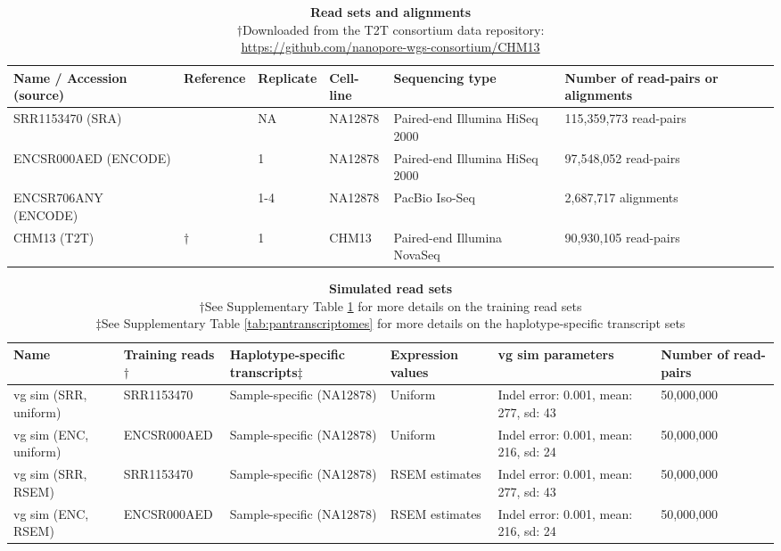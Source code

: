 \documentclass[11pt]{ucthesis}
\begin{document}
\begin{table}[H]
\footnotesize
\begin{tabular}{L{0.15\textwidth}| L{0.1\textwidth} | L{0.09\textwidth} | L{0.09\textwidth} | L{0.17\textwidth} | R{0.16\textwidth}}
\textbf{Name / Accession (source)} & \textbf{Reference} & \textbf{Replicate} & \textbf{Cell-line} & \textbf{Sequencing type} & \textbf{Number of read-pairs or alignments} \\
\midrule
SRR1153470 (SRA) & \cite{tilgner2014defining} & NA & NA12878 & Paired-end Illumina HiSeq 2000 & 115,359,773 read-pairs \\
\midrule
ENCSR000AED (ENCODE) & \cite{encode2012integrated,davis2017encycolopedia} & 1 & NA12878 & Paired-end Illumina HiSeq 2000 & 97,548,052 read-pairs \\
\midrule
ENCSR706ANY (ENCODE) & \cite{encode2012integrated,davis2017encycolopedia} & 1-4 & NA12878 & PacBio Iso-Seq & 2,687,717 alignments \\
\midrule
CHM13 (T2T) & $\dag$ & 1 & CHM13 & Paired-end Illumina NovaSeq & 90,930,105  read-pairs
\end{tabular}
\caption{\textbf{Read sets and alignments}\\
$\dag$Downloaded from the T2T consortium data repository:\\ \protect\url{https://github.com/nanopore-wgs-consortium/CHM13}
}
\label{tab:read-sets}
\end{table}

\begin{table}[H]
\footnotesize
\begin{tabular}{L{0.12\textwidth}| L{0.14\textwidth} | L{0.13\textwidth} | L{0.12\textwidth} | L{0.15\textwidth} | R{0.11\textwidth}}
\textbf{Name} & \textbf{Training reads}$\dag$ & \textbf{Haplotype-specific transcripts}$\ddag$ & \textbf{Expression values} & \textbf{vg sim parameters} & \textbf{Number of read-pairs} \\
\midrule
vg sim (SRR, uniform) & SRR1153470 & Sample-specific (NA12878) & Uniform& Indel error: 0.001, mean: 277, sd: 43 & 50,000,000 \\
\midrule
vg sim (ENC, uniform) & ENCSR000AED & Sample-specific (NA12878) & Uniform & Indel error: 0.001, mean: 216, sd: 24 & 50,000,000 \\
\midrule
vg sim (SRR, RSEM) & SRR1153470 & Sample-specific (NA12878) & RSEM estimates & Indel error: 0.001, mean: 277, sd: 43 & 50,000,000 \\
\midrule
vg sim (ENC, RSEM) & ENCSR000AED & Sample-specific (NA12878) & RSEM estimates & Indel error: 0.001, mean: 216, sd: 24 & 50,000,000
\end{tabular}
\caption{\textbf{Simulated read sets}\\
$\dag$See Supplementary Table \ref{tab:read-sets} for more details on the training read sets \\
$\ddag$See Supplementary Table \ref{tab:pantranscriptomes} for more details on the haplotype-specific transcript sets}
\label{tab:sim-data}
\end{table}
\end{document}
